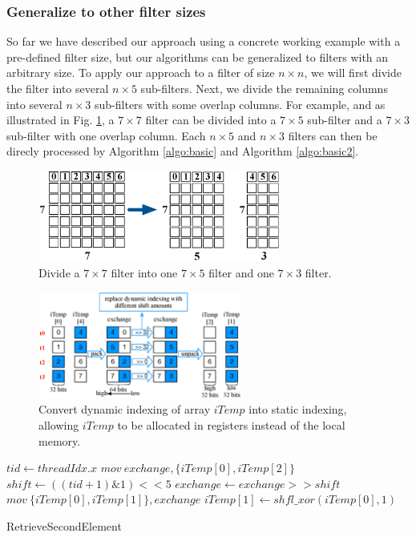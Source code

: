 \subsubsection{Generalize to other filter sizes} So far we have described our approach using a concrete working example with a pre-defined
filter size, but our algorithms can be generalized to filters with an arbitrary size. To apply our approach to a filter of size $n \times
n$, we will first divide the filter into several $n \times 5$ sub-filters. Next, we divide the remaining columns into several $n \times 3$
sub-filters with some overlap columns. For example, and as illustrated in Fig. \ref{fig:split7x7}, a $7 \times 7$ filter can be divided into
a $7 \times 5$ sub-filter and a $7 \times 3$ sub-filter with one overlap column. Each $n \times 5$ and $n \times 3$ filters can then be
direcly processed by Algorithm \ref{algo:basic} and Algorithm \ref{algo:basic2}.
\begin{figure}[t!]
\centering
  \includegraphics[height=3cm]{./figure/split7x7.eps}
  \caption{Divide a $7 \times 7$ filter into one $7 \times 5$ filter and one $7 \times 3$ filter.}
  \label{fig:split7x7}
\end{figure}

\begin{figure}[t!]
	\centering
	\includegraphics[width=0.8\columnwidth,height=3.5cm]{./figure/exchange.eps}
\caption{Convert dynamic indexing of array $iTemp$ into static indexing, allowing  $iTemp$ to be allocated in registers instead of the local memory.}
\label{fig:exchange}
\end{figure}

\begin{algorithm}[t!]
\small
	$tid \gets threadIdx.x$\;
	$mov\ exchange, \{iTemp[0], iTemp[2]\}$\;
	$shift \gets ((tid+1)\&1)<<5$\;
	$exchange \gets exchange >> shift$\;
	$mov\ \{iTemp[0],iTemp[1]\}, exchange$\;
	$iTemp[1] \gets shfl\_xor(iTemp[0],1)$\;	
	\caption{RetrieveSecondElement}
	\label{algo:basic2}
\end{algorithm}


